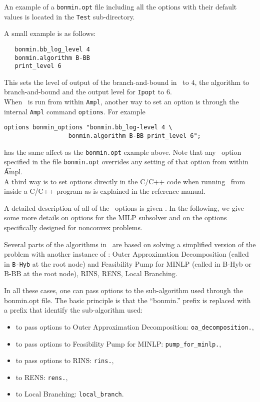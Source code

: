 An example of a {\tt bonmin.opt} file including all the options
with their default values is located in the {\tt Test}
sub-directory.

A small example is as follows:
\begin{verbatim}
   bonmin.bb_log_level 4
   bonmin.algorithm B-BB
   print_level 6
\end{verbatim}
This sets the level of output of the branch-and-bound in \Bonmin\ to $4$, the algorithm to branch-and-bound
and the output level for {\tt Ipopt} to $6$.\\

When \Bonmin\ is run from within {\tt Ampl}, another way to set
an option is through the
internal {\tt Ampl} command {\tt options}.
For example
\begin{verbatim}
options bonmin_options "bonmin.bb_log-level 4 \
                  bonmin.algorithm B-BB print_level 6";
\end{verbatim}
has the same affect as the {\tt bonmin.opt} example above.
Note that any \Bonmin\ option specified in the file {\tt bonmin.opt}
overrides any setting of that option from within {\t Ampl}.\\

A third way is to set options directly in the C/C++ code when
running \Bonmin\ from inside a C/C++ program as is explained in the reference manual.

A detailed description of all of the \Bonmin\ options is given .
In the following, we give some more details on options for the MILP subsolver and
on the options specifically designed
for nonconvex problems.\\

\latexhtml{

}{
}

\label{sec:sub_solvers}
Several parts of the algorithms in \Bonmin\ are based on solving a simplified version of the problem with another instance of \Bonmin:
Outer Approximation Decomposition (called in {\tt B-Hyb} at the root node)
and Feasibility Pump for MINLP (called in B-Hyb or B-BB at the root node), RINS, RENS, Local Branching.

In all these cases, one can pass options to the sub-algorithm used through the bonmin.opt file. The basic principle is
that the ``bonmin.'' prefix  is replaced with a prefix that identify the sub-algorithm used:
\begin{itemize}
\item to pass options to Outer Approximation Decomposition: {\tt oa\_decomposition.},
\item to pass options to Feasibility Pump for MINLP: {\tt pump\_for\_minlp.},
\item to pass options to RINS: {\tt rins.},
\item to RENS: {\tt rens.},
\item to Local Branching: {\tt local\_branch}.
\end{itemize}


